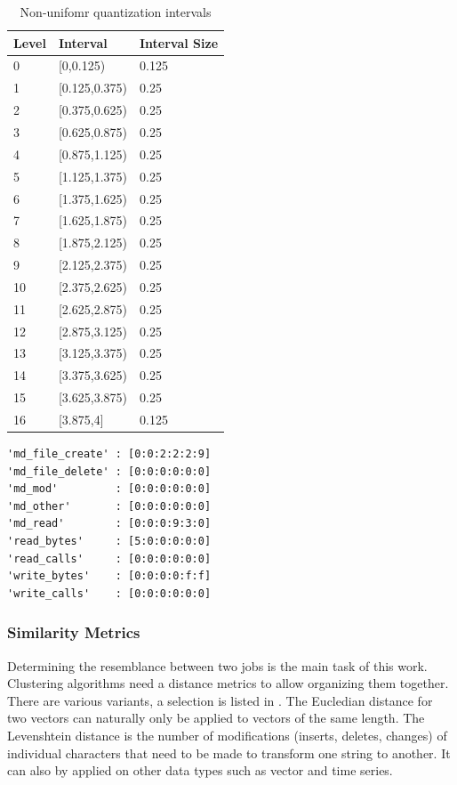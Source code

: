 \documentclass{jhps}
\begin{document}
\begin{table}
\begin{tabular}{lll}
Level & Interval      & Interval Size \\ 
\midrule
0     & [0,0.125)     & 0.125         \\ 
1     & [0.125,0.375) & 0.25          \\ 
2     & [0.375,0.625) & 0.25          \\ 
3     & [0.625,0.875) & 0.25          \\ 
4     & [0.875,1.125) & 0.25          \\ 
5     & [1.125,1.375) & 0.25          \\ 
6     & [1.375,1.625) & 0.25          \\ 
7     & [1.625,1.875) & 0.25          \\ 
8     & [1.875,2.125) & 0.25          \\ 
9     & [2.125,2.375) & 0.25          \\ 
10    & [2.375,2.625) & 0.25          \\ 
11    & [2.625,2.875) & 0.25          \\ 
12    & [2.875,3.125) & 0.25          \\ 
13    & [3.125,3.375) & 0.25          \\ 
14    & [3.375,3.625) & 0.25          \\ 
15    & [3.625,3.875) & 0.25          \\ 
16    & [3.875,4]     & 0.125         \\ 
\end{tabular}
\caption{Non-unifomr quantization intervals}
\label{tab:quant_intervals}
\end{table}


\begin{lstlisting}[caption={Hexadecimal coding of a six segments long job.}]
'md_file_create' : [0:0:2:2:2:9]
'md_file_delete' : [0:0:0:0:0:0]
'md_mod'         : [0:0:0:0:0:0]
'md_other'       : [0:0:0:0:0:0]
'md_read'        : [0:0:0:9:3:0]
'read_bytes'     : [5:0:0:0:0:0]
'read_calls'     : [0:0:0:0:0:0]
'write_bytes'    : [0:0:0:0:f:f]
'write_calls'    : [0:0:0:0:0:0]
\end{lstlisting}

\subsubsection{Similarity Metrics}
Determining the resemblance between two jobs is the main task of this work.
Clustering algorithms need a distance metrics to allow organizing them together.
There are various variants, a selection is listed in .
The Eucledian distance for two vectors can naturally only be applied to vectors of the same length.
The Levenshtein distance is the number of modifications (inserts, deletes, changes) of individual characters that need to be made to transform one string to another.
It can also by applied on other data types such as vector and time series.
\end{document}
